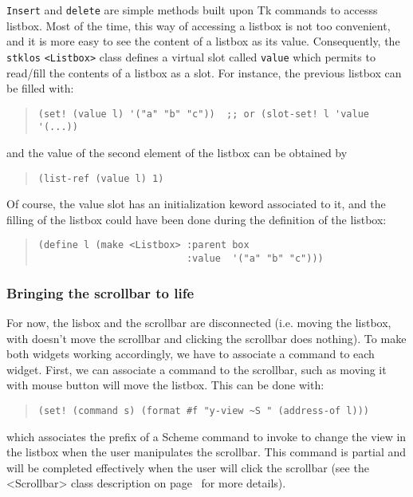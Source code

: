 {\tt Insert} and {\tt delete} are simple methods built upon Tk commands to
accesss listbox. Most of the time, this way of accessing a listbox is not
too convenient, and it is more easy to see the content of a listbox as its
value. Consequently, the {\tt stklos} {\tt <Listbox>} class defines a
virtual slot\cite{virtual slot} called {\tt value} which
permits to read/fill the contents of a listbox as a {\stklos} slot.
For instance, the previous listbox can be filled with:
\begin{quote}
\begin{verbatim}
(set! (value l) '("a" "b" "c"))  ;; or (slot-set! l 'value '(...))
\end{verbatim}
\end{quote}
and the value of the second element of the listbox can be obtained by
\begin{quote}
\begin{verbatim}
(list-ref (value l) 1)
\end{verbatim}
\end{quote}

Of course, the value slot has an initialization keword associated to it,
and the filling of the listbox could have been done during the definition
of the listbox:
\begin{quote}
\begin{verbatim}
(define l (make <Listbox> :parent box 
                          :value  '("a" "b" "c")))
\end{verbatim}
\end{quote}

\subsubsection{Bringing the scrollbar to life}

For now, the lisbox and the scrollbar are disconnected (i.e. moving the
listbox, with {\tt <Shift-Button2>} doesn't move the scrollbar and clicking
the scrollbar does nothing). To make both widgets working accordingly, we have
to associate a command to each widget. First, we can associate a command to
the scrollbar, such as moving it with mouse button will move the listbox. This
can be done with:
\begin{quote}
\begin{verbatim}
(set! (command s) (format #f "y-view ~S " (address-of l)))
\end{verbatim}
\end{quote}
which associates the prefix of a Scheme command to invoke to change the view
in the listbox when the user manipulates the scrollbar. This command is
partial and will be completed effectively when the user will click the
scrollbar (see the <Scrollbar> class description on
page~\pageref{Scrollbar-class} for more details).

